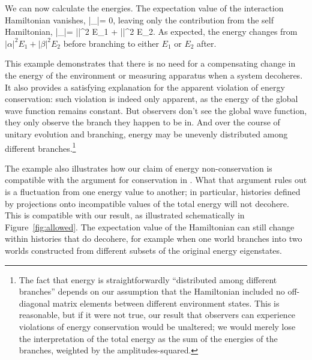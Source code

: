 \documentclass[aps,prd,onecolumn,nofootinbib,notitlepage]{revtex4-1}
\begin{document}
We can now calculate the energies.
The expectation value of the interaction Hamiltonian vanishes,
\be
  \langle\psi |\ham_|\psi\rangle = 0,
\ee
leaving only the contribution from the self Hamiltonian,
\be
  \langle\psi |\ham_|\psi\rangle = |\alpha|^2 E_1 + |\beta|^2 E_2.
\ee
As expected, the energy changes from $|\alpha|^2 E_1 + |\beta|^2 E_2$ before branching to either $E_1$ or $E_2$ after.

This example demonstrates that there is no need for a compensating change in the energy of the environment or measuring apparatus when a system decoheres.
It also provides a satisfying explanation for the apparent violation of energy conservation: such violation is indeed only apparent, as the energy of the global wave function remains constant.
But observers don't see the global wave function, they only observe the branch they happen to be in.
And over the course of unitary evolution and branching, energy may be unevenly distributed among different branches.\footnote{The fact that energy is straightforwardly ``distributed among different branches'' depends on our assumption that the Hamiltonian included no off-diagonal matrix elements between different environment states. This is reasonable, but if it were not true, our result that observers can experience violations of energy conservation would be unaltered; we would merely lose the interpretation of the total energy as the sum of the energies of the branches, weighted by the amplitudes-squared.}

The example also illustrates how our claim of energy non-conservation is compatible with the argument for conservation in \cite{griffiths,hartle1995conservation}.
What that argument rules out is a fluctuation from one energy value to another; in particular, histories defined by projections onto incompatible values of the total energy will not decohere.
This is compatible with our result, as illustrated schematically in Figure~\ref{fig:allowed}.
The expectation value of the Hamiltonian can still change within histories that do decohere, for example when one world branches into two worlds constructed from different subsets of the original energy eigenstates.
\end{document}

